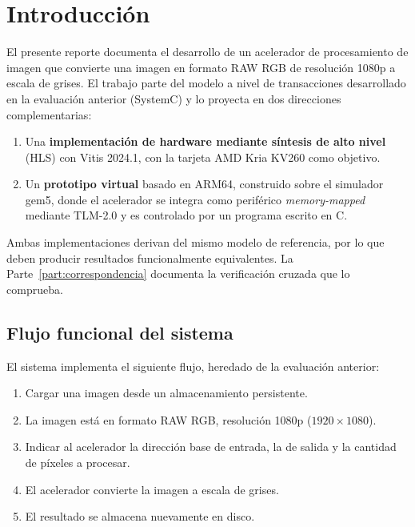 \documentclass[11pt,letterpaper]{article}
\begin{document}
\section{Introducción}

El presente reporte documenta el desarrollo de un acelerador de procesamiento de
imagen que convierte una imagen en formato RAW RGB de resolución 1080p a escala
de grises. El trabajo parte del modelo a nivel de transacciones desarrollado en
la evaluación anterior (SystemC) y lo proyecta en dos direcciones
complementarias:

\begin{enumerate}[leftmargin=*]
  \item Una \textbf{implementación de hardware mediante síntesis de alto nivel}
        (HLS) con Vitis 2024.1, con la tarjeta AMD Kria KV260 como objetivo.
  \item Un \textbf{prototipo virtual} basado en ARM64, construido sobre el
        simulador gem5, donde el acelerador se integra como periférico
        \emph{memory-mapped} mediante TLM-2.0 y es controlado por un programa
        escrito en C.
\end{enumerate}

Ambas implementaciones derivan del mismo modelo de referencia, por lo que deben
producir resultados funcionalmente equivalentes. La Parte~\ref{part:correspondencia}
documenta la verificación cruzada que lo comprueba.

\subsection{Flujo funcional del sistema}

El sistema implementa el siguiente flujo, heredado de la evaluación anterior:

\begin{enumerate}[leftmargin=*,itemsep=2pt]
  \item Cargar una imagen desde un almacenamiento persistente.
  \item La imagen está en formato RAW RGB, resolución 1080p
        ($1920 \times 1080$).
  \item Indicar al acelerador la dirección base de entrada, la de salida y la
        cantidad de píxeles a procesar.
  \item El acelerador convierte la imagen a escala de grises.
  \item El resultado se almacena nuevamente en disco.
\end{enumerate}
\end{document}
